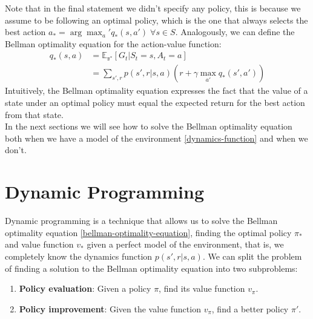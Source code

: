 Note that in the final statement we didn't specify any policy, this is because we assume to be following an optimal policy, which is the one that always selects the best action $a_* = \arg \max_a' q_*(s, a') \; \forall s \in S$.
Analogously, we can define the Bellman optimality equation for the action-value function:
\begin{equation}
    \begin{split}
        q_{*}(s, a) & = \mathds{E_{\pi^*}}[G_t | S_t = s, A_t = a] \\
        & = \sum_{s', r} p(s', r | s, a) (r + \gamma \max_{a'} q_*(s', a'))
    \end{split}
    \label{bellman-optimality-equation-action-value}
\end{equation}
Intuitively, the Bellman optimality equation expresses the fact that the value of a state under an optimal policy must equal the expected return for the best action from that state.\\
In the next sections we will see how to solve the Bellman optimality equation both when we have a model of the environment \eqref{dynamics-function} and when we don't.

\section{Dynamic Programming}
Dynamic programming is a technique that allows us to solve the Bellman optimality equation \eqref{bellman-optimality-equation}, finding the optimal policy $\pi_*$ and value function $v_*$ given a perfect model of the environment, that is, we completely know the dynamics function $p(s', r | s, a)$.
We can split the problem of finding a solution to the Bellman optimality equation into two subproblems:
\begin{enumerate}
    \item \textbf{Policy evaluation}: Given a policy $\pi$, find its value function $v_{\pi}$.
    \item \textbf{Policy improvement}: Given the value function $v_{\pi}$, find a better policy $\pi'$.
\end{enumerate}

